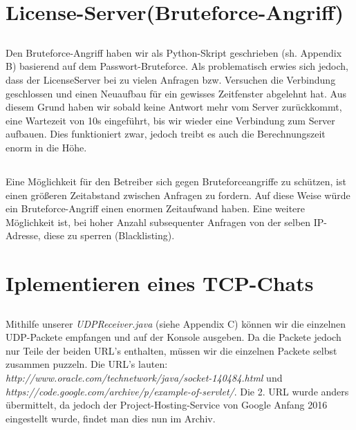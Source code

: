 \documentclass{scrartcl}
\begin{document}
  \section{License-Server(Bruteforce-Angriff)}
  \label{sec:License-Server(Bruteforce-Angriff)}
    \subsection{}
    \label{sub:4.1}
      Den Bruteforce-Angriff haben wir als Python-Skript geschrieben (sh.
      Appendix B) basierend auf dem Passwort-Bruteforce. Als problematisch
      erwies sich jedoch, dass der LicenseServer bei zu vielen Anfragen bzw.
      Versuchen die Verbindung geschlossen und einen Neuaufbau für ein
      gewisses Zeitfenster abgelehnt hat. Aus diesem Grund haben wir sobald
      keine Antwort mehr vom Server zurückkommt, eine Wartezeit von 10s
      eingeführt, bis wir wieder eine Verbindung zum Server aufbauen. Dies
      funktioniert zwar, jedoch treibt es auch die Berechnungszeit enorm in die
      Höhe.
    \subsection{}
    \label{sub:4.2}
      Eine Möglichkeit für den Betreiber sich gegen Bruteforceangriffe zu
      schützen, ist einen größeren Zeitabstand zwischen Anfragen zu fordern.
      Auf diese Weise würde ein Bruteforce-Angriff einen enormen Zeitaufwand
      haben. Eine weitere Möglichkeit ist, bei hoher Anzahl subsequenter
      Anfragen von der selben IP-Adresse, diese zu sperren (Blacklisting).
    \subsection{}
    \label{sub:4.3}

  \section{Iplementieren eines TCP-Chats}
  \label{sec:Iplementieren eines TCP-Chats}
    \subsection{}
    \label{sub:5.1}
      Mithilfe unserer \textit{UDPReceiver.java} (siehe Appendix C) können wir
      die einzelnen UDP-Packete empfangen und auf der Konsole ausgeben.
      Da die Packete jedoch nur Teile der beiden URL's enthalten, müssen wir
      die einzelnen Packete selbst zusammen puzzeln. Die URL's lauten:
      \textit{http://www.oracle.com/technetwork/java/socket-140484.html} und\\
      \textit{https://code.google.com/archive/p/example-of-servlet/}. Die
      2. URL wurde anders übermittelt, da jedoch der Project-Hosting-Service
      von Google Anfang 2016 eingestellt wurde, findet man dies nun im Archiv.
\end{document}
